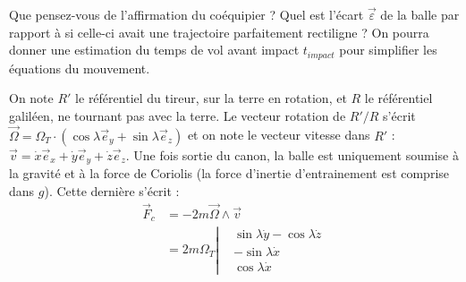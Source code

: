 Que pensez-vous de l'affirmation du coéquipier ? Quel est l'écart $\vec{\varepsilon}$ de la balle par rapport à si celle-ci avait une trajectoire parfaitement rectiligne ? On pourra donner une estimation du temps de vol avant impact $t_{impact}$ pour simplifier les équations du mouvement.

\newpage

\begin{correction}

On note $R'$ le référentiel du tireur, sur la terre en rotation, et $R$ le référentiel galiléen, ne tournant pas avec la terre. Le vecteur rotation de $R'/R$ s'écrit $\vec{\Omega}=\Omega_T\cdot(\cos\lambda\vec{e}_y+\sin\lambda\vec{e}_z)$ et on note le vecteur vitesse dans $R'$ : $\vec{v}=\dot{x}\vec{e}_x+\dot{y}\vec{e}_y+\dot{z}\vec{e}_z$. Une fois sortie du canon, la balle est uniquement soumise à la gravité et à la force de Coriolis (la force d'inertie d'entrainement est comprise dans $g$). Cette dernière s'écrit :
	\begin{align*}
		\vec{F}_c&=-2m\vec{\Omega}\wedge\vec{v} \\
		&=2m\Omega_T\left\lvert 
      \begin{matrix} 
        &\sin\lambda\dot{y}-\cos\lambda\dot{z}\\ 
        &-\sin\lambda\dot{x} \\
         &\cos\lambda\dot{x}
      \end{matrix}  
    \right.
	\end{align*}


\end{correction}
